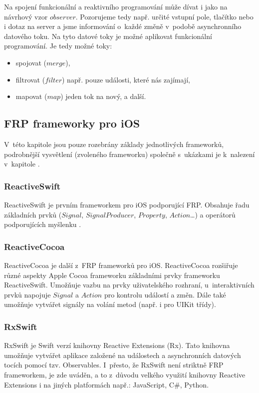 \documentclass[thesis=M,czech]{FITthesis}[2012/06/26]
\begin{document}
Na spojení funkcionální a reaktivního programování může dívat i jako na návrhový vzor $observer$. \cite{Blackheath2016} Pozorujeme tedy např. určité vstupní pole, tlačítko nebo i dotaz na server a jsme informování o~každé změně v~podobě asynchronního datového toku. Na tyto datové toky je možné aplikovat funkcionální programování. Je tedy možné toky:
\begin{itemize}
\item spojovat ($merge$),
\item filtrovat ($filter$) např. pouze události, které nás zajímají,
\item mapovat ($map$) jeden tok na nový, a další. \cite{Ztaltz2014}
\end{itemize}

\subsection{FRP frameworky pro iOS}
V~této kapitole jsou pouze rozebrány základy jednotlivých frameworků, podrobnější vysvětlení (zvoleného frameworku) společně s~ukázkami je k~nalezení v~kapitole .

\subsubsection{ReactiveSwift}
ReactiveSwift je prvním frameworkem pro iOS podporující FRP. Obsahuje řadu základních prvků ($Signal$, $SignalProducer$, $Property$, $Action$\ldots) a operátorů podporujících myšlenku . \cite{ReactiveSwift}

\subsubsection{ReactiveCocoa}
ReactiveCocoa je další z~FRP frameworků pro iOS. ReactiveCocoa rozšiřuje různé aspekty Apple Cocoa frameworku základními prvky frameworku ReactiveSwift. Umožňuje vazbu na prvky uživatelského rozhraní, u~interaktivních prvků napojuje $Signal$ a $Action$ pro kontrolu událostí a změn. Dále také umožňuje vytvářet signály na volání metod (např. i pro UIKit třídy). \cite{ReactiveCocoa}

\subsubsection{RxSwift}
RxSwift je Swift verzí knihovny Reactive Extensions (Rx). \cite{RxSwift} Tato knihovna umožňuje vytvářet aplikace založené na událostech a asynchronních datových tocích pomocí tzv. Observables. \cite{RxNET} I~přesto, že RxSwift není striktně FRP frameworkem, \cite{ReactiveExtensionsDocs} je zde uváděn, a to z~důvodu velkého využití knihovny Reactive Extensions i na jiných platformách např.: JavaScript, C\#, Python. \cite{ReactiveExtensions}
\end{document}
